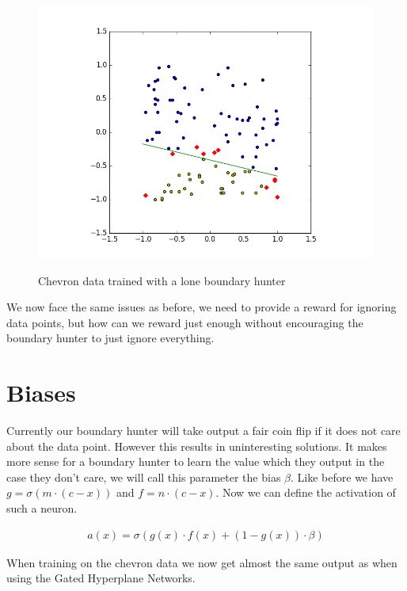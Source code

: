 \documentclass[notitlepage]{report}
\theoremstyle{definition}
\begin{document}
\begin{figure}[H]
  \centering
  \begin{minipage}[b]{0.8\textwidth}
    \includegraphics[width=\textwidth]{CHEVData-SingleBH.png}
    \caption{}
  \end{minipage}
  \hfill

Chevron data trained with a lone boundary hunter
\end{figure}

We now face the same issues as before, we need to provide a reward for ignoring data points, but how can we reward just enough without encouraging the boundary hunter to just ignore everything.

\section{Biases}
Currently our boundary hunter will take output a fair coin flip if it does not care about the data point. However this results in uninteresting solutions. It makes more sense for a boundary hunter to learn the value which they output in the case they don't care, we will call this parameter the bias $\beta$. Like before we have $g = \sigma(m \cdot (c - x))$ and $f = n \cdot (c - x)$. Now we can define the activation of such a neuron.

\begin{align}
a(x) = \sigma(g(x) \cdot f(x) + (1 - g(x)) \cdot \beta)
\end{align}

When training on the chevron data we now get almost the same output as when using the Gated Hyperplane Networks.
\end{document}

